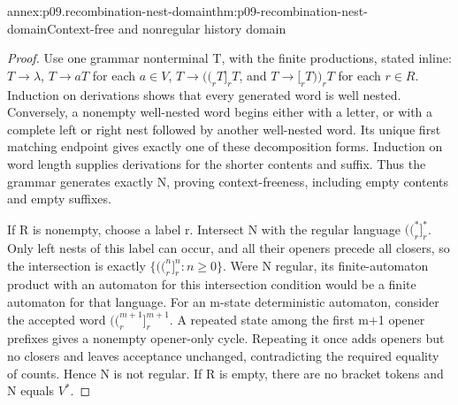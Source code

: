 \begin{annexitem}{annex:p09.recombination-nest-domain}{thm:p09-recombination-nest-domain}{Context-free and nonregular history domain}
\begin{proof}
Use one grammar nonterminal T, with the finite productions, stated inline:
\(T\to\lambda\), \(T\to aT\) for each \(a\in V\),
\(T\to \mathopen{(\!(}_rT]_rT\), and \(T\to [_rT\mathclose{)\!)}_rT\) for each \(r\in R\).
Induction on derivations shows that every generated word is well nested.
Conversely, a nonempty well-nested word begins either with a letter,
or with a complete left or right nest followed by another well-nested word.
Its unique first matching endpoint gives exactly one of these decomposition
forms. Induction on word length supplies derivations for the shorter
contents and suffix. Thus the grammar generates exactly N, proving
context-freeness, including empty contents and empty suffixes.

If R is nonempty, choose a label r. Intersect N with the regular language
\(\mathopen{(\!(}_r^*]_r^*\). Only left nests of this label can occur, and all their
openers precede all closers, so the intersection is exactly
\(\{\mathopen{(\!(}_r^n]_r^n:n\geq0\}\).
Were N regular, its finite-automaton product with an automaton for this
intersection condition would be a finite automaton for that language.
For an m-state deterministic automaton, consider the accepted word
\(\mathopen{(\!(}_r^{m+1}]_r^{m+1}\). A repeated state among the first m+1 opener
prefixes gives a nonempty opener-only cycle. Repeating it once adds
openers but no closers and leaves acceptance unchanged, contradicting
the required equality of counts. Hence N is not regular.
If R is empty, there are no bracket tokens and N equals \(V^*\).
\end{proof}
\end{annexitem}
